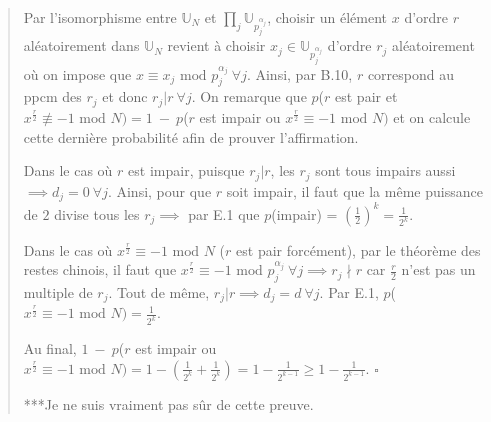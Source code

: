\begin{quote}
    Par l'isomorphisme entre $\mathbb{U}_N$ et $\prod_j\mathbb{U}_{p_j^{\alpha_j}}$, choisir un élément $x$ d'ordre $r$ aléatoirement dans $\mathbb{U}_N$ revient à choisir $x_j \in \mathbb{U}_{p_j^{\alpha_j}}$ d'ordre $r_j$ aléatoirement où on impose que $x \equiv x_j \text{ mod } p_j^{\alpha_j} \ \forall j$. Ainsi, par B.10, $r$ correspond au ppcm des $r_j$ et donc $r_j|r \ \forall j$. On remarque que $p$($r$ est pair et $x^{\frac{r}{2}} \not\equiv -1 \text{ mod } N) = 1 \ - \ $$p$($r$ est impair ou $x^{\frac{r}{2}} \equiv -1 \text{ mod } N)$ et on calcule cette dernière probabilité afin de prouver l'affirmation.

    Dans le cas où $r$ est impair, puisque $r_j|r$, les $r_j$ sont tous impairs aussi $\implies d_j = 0 \ \forall j$. Ainsi, pour que $r$ soit impair, il faut que la même puissance de $2$ divise tous les $r_j \implies$ par E.1 que $p$(impair) = $\left(\frac{1}{2}\right)^k = \frac{1}{2^k}$.

    Dans le cas où $x^{\frac{r}{2}} \equiv -1 \text{ mod } N$ ($r$ est pair forcément), par le théorème des restes chinois, il faut que $x^{\frac{r}{2}} \equiv -1 \text{ mod } p_j^{\alpha_j} \ \forall j \implies r_j \nmid r$ car $\frac{r}{2}$ n'est pas un multiple de $r_j$. Tout de même, $r_j|r \implies d_j = d \ \forall j$. Par E.1, $p$($x^{\frac{r}{2}} \equiv -1 \text{ mod } N) = \frac{1}{2^k}$.

    Au final, $1 \ - \ $$p$($r$ est impair ou $x^{\frac{r}{2}} \equiv -1 \text{ mod } N) = 1 - \left(\frac{1}{2^k} + \frac{1}{2^k}\right) = 1 - \frac{1}{2^{k-1}} \geq 1 - \frac{1}{2^{k-1}}$. $\square$ 

    ***Je ne suis vraiment pas sûr de cette preuve.
\end{quote}
